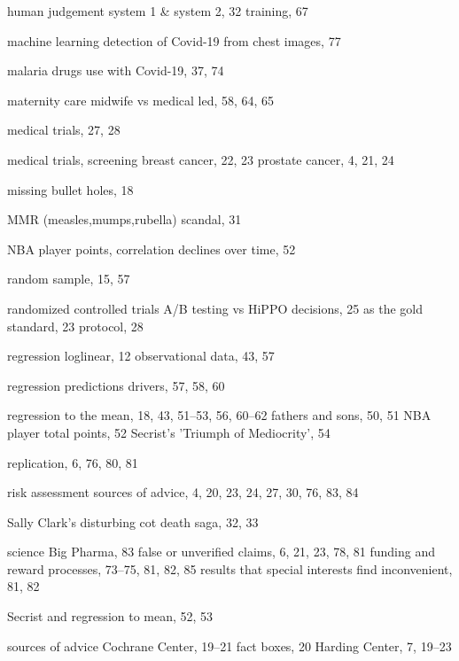 \documentclass[
  10pt,
  b5paper]{book}
\begin{document}
\begin{theindex}
  \indexspace

  \item human judgement
    \subitem system 1 \& system 2, 32
    \subitem training, 67

  \indexspace

  \item machine learning
    \subitem detection of Covid-19 from chest images, 77
  \item malaria drugs
    \subitem use with Covid-19, 37, 74
  \item maternity care
    \subitem midwife vs medical led, 58, 64, 65
  \item medical trials, 27, 28
  \item medical trials, screening
    \subitem breast cancer, 22, 23
    \subitem prostate cancer, 4, 21, 24
  \item missing bullet holes, 18
  \item MMR (measles,mumps,rubella) scandal, 31

  \indexspace

  \item NBA player points, correlation declines over time, 52

  \indexspace

  \item random sample, 15, 57
  \item randomized controlled trials
    \subitem A/B testing vs HiPPO decisions, 25
    \subitem as the gold standard, 23
    \subitem protocol, 28
  \item regression
    \subitem loglinear, 12
    \subitem observational data, 43, 57
  \item regression predictions
    \subitem drivers, 57, 58, 60
  \item regression to the mean, 18, 43, 51--53, 56, 60--62
    \subitem fathers and sons, 50, 51
    \subitem NBA player total points, 52
    \subitem Secrist's 'Triumph of Mediocrity', 54
  \item replication, 6, 76, 80, 81
  \item risk assessment
    \subitem sources of advice, 4, 20, 23, 24, 27, 30, 76, 83, 84

  \indexspace

  \item Sally Clark's disturbing cot death saga, 32, 33
  \item science
    \subitem Big Pharma, 83
    \subitem false or unverified claims, 6, 21, 23, 78, 81
    \subitem funding and reward processes, 73--75, 81, 82, 85
    \subitem results that special interests find inconvenient, 81, 82
  \item Secrist and regression to mean, 52, 53
  \item sources of advice
    \subitem Cochrane Center, 19--21
    \subitem fact boxes, 20
    \subitem Harding Center, 7, 19--23


\end{theindex}
\end{document}
